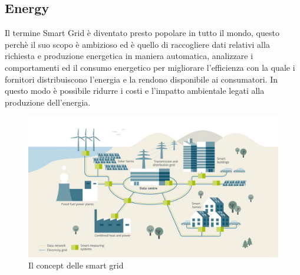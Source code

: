 \subsection{Energy}
Il termine Smart Grid è diventato presto popolare in tutto il mondo, questo perchè il suo scopo è ambizioso ed è quello di raccogliere dati relativi alla richiesta e produzione energetica in maniera automatica, analizzare i comportamenti ed il consumo energetico per migliorare l'efficienza con la quale i fornitori distribuiscono l'energia e la rendono disponibile ai consumatori.
In questo modo è possibile ridurre i costi e l'impatto ambientale legati alla produzione dell'energia.
\begin{figure}
	\begin{center}
		\includegraphics[width=0.8\columnwidth]{images/application_smart_grid_1}
	\end{center}
	\caption{Il concept delle smart grid}
	\label{fig:application_smart_grid_1}
\end{figure}
